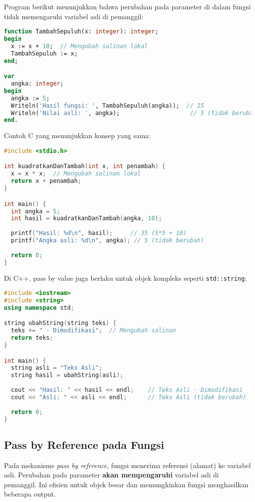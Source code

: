 \documentclass[../main.tex]{subfiles}
\begin{document}
Program berikut menunjukkan bahwa perubahan pada parameter di dalam fungsi tidak memengaruhi variabel asli di pemanggil:

\begin{lstlisting}[language=Pascal, caption={Pass by value (Pascal)}]
function TambahSepuluh(x: integer): integer;
begin
  x := x + 10;  // Mengubah salinan lokal
  TambahSepuluh := x;
end;

var
  angka: integer;
begin
  angka := 5;
  Writeln('Hasil fungsi: ', TambahSepuluh(angka));  // 15
  Writeln('Nilai asli: ', angka);                    // 5 (tidak berubah)
end.
\end{lstlisting}

Contoh C yang menunjukkan konsep yang sama:

\begin{lstlisting}[language=C, caption={Pass by value (C)}]
#include <stdio.h>

int kuadratkanDanTambah(int x, int penambah) {
  x = x * x;  // Mengubah salinan lokal
  return x + penambah;
}

int main() {
  int angka = 5;
  int hasil = kuadratkanDanTambah(angka, 10);
  
  printf("Hasil: %d\n", hasil);     // 35 (5*5 + 10)
  printf("Angka asli: %d\n", angka); // 5 (tidak berubah)
  
  return 0;
}
\end{lstlisting}

Di C++, pass by value juga berlaku untuk objek kompleks seperti \texttt{std::string}:

\begin{lstlisting}[language=C++, caption={Pass by value dengan objek (C++)}]
#include <iostream>
#include <string>
using namespace std;

string ubahString(string teks) {
  teks += " - Dimodifikasi";  // Mengubah salinan
  return teks;
}

int main() {
  string asli = "Teks Asli";
  string hasil = ubahString(asli);
  
  cout << "Hasil: " << hasil << endl;    // Teks Asli - Dimodifikasi
  cout << "Asli: " << asli << endl;      // Teks Asli (tidak berubah)
  
  return 0;
}
\end{lstlisting}

\subsection{Pass by Reference pada Fungsi}
Pada mekanisme \emph{pass by reference}, fungsi menerima referensi (alamat) ke variabel asli. Perubahan pada parameter \textbf{akan mempengaruhi} variabel asli di pemanggil. Ini efisien untuk objek besar dan memungkinkan fungsi menghasilkan beberapa output.
\end{document}
